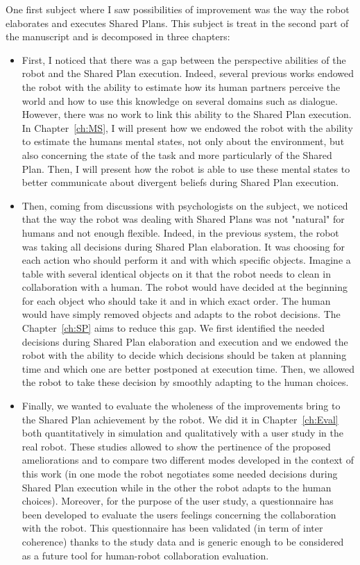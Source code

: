 \documentclass[english,a4paper,11pt,twoside]{StyleThese}
\begin{document}
One first subject where I saw possibilities of improvement was the way the robot elaborates and executes Shared Plans. This subject is treat in the second part of the manuscript and is decomposed in three chapters:
\begin{itemize}
\item First, I noticed that there was a gap between the perspective abilities of the robot and the Shared Plan execution. Indeed, several previous works endowed the robot with the ability to estimate how its human partners perceive the world and how to use this knowledge on several domains such as dialogue. However, there was no work to link this ability to the Shared Plan execution. In Chapter~\ref{ch:MS}, I will present how we endowed the robot with the ability to estimate the humans mental states, not only about the environment, but also concerning the state of the task and more particularly of the Shared Plan. Then, I will present how the robot is able to use these mental states to better communicate about divergent beliefs during Shared Plan execution.
\item Then, coming from discussions with psychologists on the subject, we noticed that the way the robot was dealing with Shared Plans was not "natural" for humans and not enough flexible. Indeed, in the previous system, the robot was taking all decisions during Shared Plan elaboration. It was choosing for each action who should perform it and with which specific objects. Imagine a table with several identical objects on it that the robot needs to clean in collaboration with a human. The robot would have decided at the beginning for each object who should take it and in which exact order. The human would have simply removed objects and adapts to the robot decisions. The Chapter~\ref{ch:SP} aims to reduce this gap. We first identified the needed decisions during Shared Plan elaboration and execution and we endowed the robot with the ability to decide which decisions should be taken at planning time and which one are better postponed at execution time. Then, we allowed the robot to take these decision by smoothly adapting to the human choices.
\item Finally, we wanted to evaluate the wholeness of the improvements bring to the Shared Plan achievement by the robot. We did it in Chapter~\ref{ch:Eval} both quantitatively in simulation and qualitatively with a user study in the real robot. These studies allowed to show the pertinence of the proposed ameliorations and to compare two different modes developed in the context of this work (in one mode the robot negotiates some needed decisions during Shared Plan execution while in the other the robot adapts to the human choices). Moreover, for the purpose of the user study, a questionnaire has been developed to evaluate the users feelings concerning the collaboration with the robot. This questionnaire has been validated (in term of inter coherence) thanks to the study data and is generic enough to be considered as a future tool for human-robot collaboration evaluation.
\end{itemize}
\end{document}
